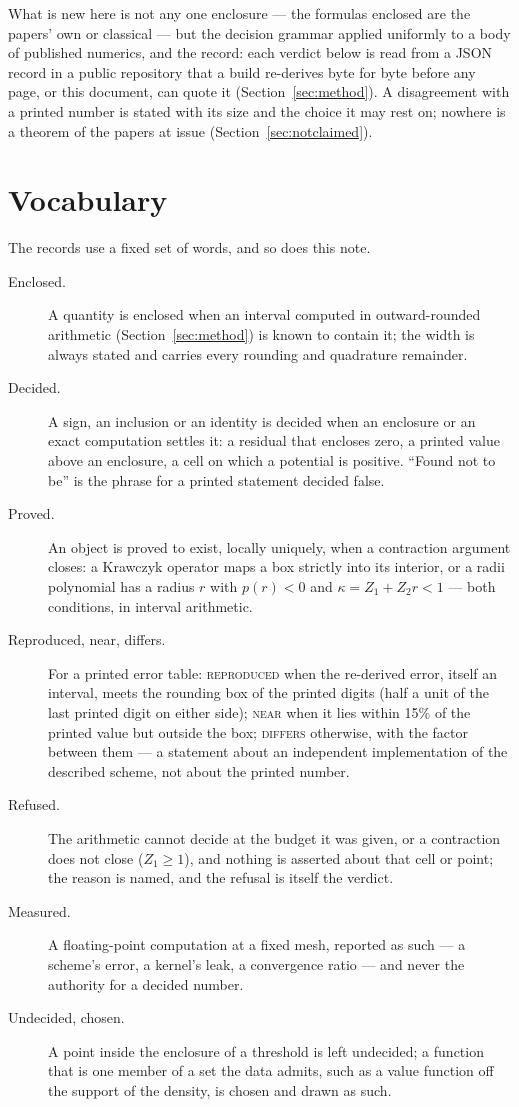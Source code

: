 \documentclass[11pt]{article}
\begin{document}
What is new here is not any one enclosure --- the formulas enclosed are the papers' own or classical --- but the decision grammar applied uniformly to a body of published numerics, and the record: each verdict below is read from a JSON record in a public repository \cite{CM} that a build re-derives byte for byte before any page, or this document, can quote it (Section~\ref{sec:method}). A disagreement with a printed number is stated with its size and the choice it may rest on; nowhere is a theorem of the papers at issue (Section~\ref{sec:notclaimed}).

\section{Vocabulary}\label{sec:vocab}

The records use a fixed set of words, and so does this note.
\begin{description}
\item[Enclosed.] A quantity is enclosed when an interval computed in outward-rounded arithmetic (Section~\ref{sec:method}) is known to contain it; the width is always stated and carries every rounding and quadrature remainder.
\item[Decided.] A sign, an inclusion or an identity is decided when an enclosure or an exact computation settles it: a residual that encloses zero, a printed value above an enclosure, a cell on which a potential is positive. ``Found not to be'' is the phrase for a printed statement decided false.
\item[Proved.] An object is proved to exist, locally uniquely, when a contraction argument closes: a Krawczyk operator maps a box strictly into its interior, or a radii polynomial has a radius $r$ with $p(r) < 0$ and $\kappa = Z_1 + Z_2 r < 1$ --- both conditions, in interval arithmetic.
\item[Reproduced, near, differs.] For a printed error table: \textsc{reproduced} when the re-derived error, itself an interval, meets the rounding box of the printed digits (half a unit of the last printed digit on either side); \textsc{near} when it lies within 15\% of the printed value but outside the box; \textsc{differs} otherwise, with the factor between them --- a statement about an independent implementation of the described scheme, not about the printed number.
\item[Refused.] The arithmetic cannot decide at the budget it was given, or a contraction does not close ($Z_1 \ge 1$), and nothing is asserted about that cell or point; the reason is named, and the refusal is itself the verdict.
\item[Measured.] A floating-point computation at a fixed mesh, reported as such --- a scheme's error, a kernel's leak, a convergence ratio --- and never the authority for a decided number.
\item[Undecided, chosen.] A point inside the enclosure of a threshold is left undecided; a function that is one member of a set the data admits, such as a value function off the support of the density, is chosen and drawn as such.
\end{description}
\end{document}
